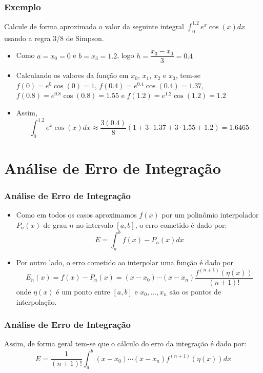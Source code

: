\documentclass{beamer}
\theoremstyle{mystyle}
\begin{document}
	\begin{frame}
		\frametitle{Exemplo}
		Calcule de forma aproximada o valor da seguinte integral $ \int_{0}^{1.2} e^{x}\cos(x) dx $ usando a regra 3/8 de Simpson.
		\pause
		
		\begin{itemize}
			\item  Como $ a = x_{0} = 0 $ e $ b = x_{3} = 1.2 $, logo $ h = \dfrac{x_{3} - x_{0}}{3} = 0.4$
			\item  Calculando os valores da função em $ x_{0} $, $ x_{1} $, $ x_{2} $ e $ x_{3} $, tem-se $ f(0)  = e^{0}\cos(0) = 1 $, $ f(0.4)  = e^{0.4}\cos(0.4) = 1.37 $, $ f(0.8)  = e^{0.8}\cos(0.8) = 1.55 $ e $ f(1.2)  = e^{1.2}\cos(1.2) = 1.2 $
			\item Assim,
			\begin{equation*}
				\int_{0}^{1.2} e^{x}\cos(x) dx \approx \dfrac{3(0.4)}{8}\left( 1 + 3\cdot1.37 + 3\cdot1.55 + 1.2 \right) = 1.6465
			\end{equation*}
		\end{itemize}
	\end{frame}

\section{Análise de Erro de Integração}
	
	\begin{frame}
		\frametitle{Análise de Erro de Integração}
		\begin{itemize}
			\item  Como em todos os casos aproximamos $ f (x) $ por um polinômio interpolador $ P_{n} (x) $ de grau $ n $ no intervalo $ [a, b] $, o erro cometido é dado por:
			\begin{equation*}
				E = \int_{a}^{b} f(x) - P_{n}(x) dx
			\end{equation*}
			\item Por outro lado, o erro cometido ao interpolar uma função é dado por
			\begin{equation*}
				E_{n}(x) = f(x) - P_{n}(x)  = (x - x_{0})\cdots(x - x_{n})\dfrac{f^{(n+1)}(\eta(x))}{(n+1)!}
			\end{equation*}
			onde $ \eta(x) $ é um ponto entre $ [a, b] $ e $ x_{0} ,\ldots, x_{n} $ são os pontos de interpolação.
		\end{itemize}
	\end{frame}

	\begin{frame}
		\frametitle{Análise de Erro de Integração}
		 Assim, de forma  geral tem-se que o cálculo do erro da integração é dado por:
		\begin{equation*}
			E = \dfrac{1}{(n+1)!}\int_{a}^{b} (x - x_{0})\cdots(x - x_{n})f^{(n+1)}(\eta(x)) dx
		\end{equation*}
	\end{frame}
\end{document}
